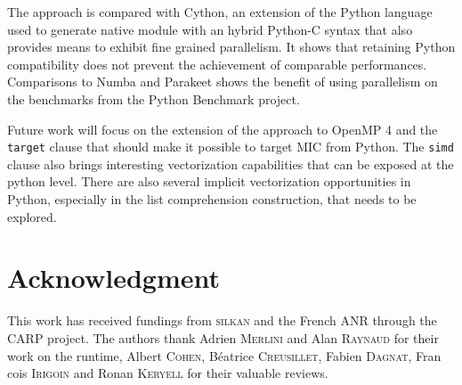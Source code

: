 \documentclass[conference]{IEEEtran}
\begin{document}
The approach is compared with Cython, an extension of the Python language used
to generate native module with an hybrid Python-C syntax that also provides
means to exhibit fine grained parallelism. It shows that retaining Python
compatibility does not prevent the achievement of comparable performances.
Comparisons to Numba and Parakeet shows the benefit of using parallelism on the
benchmarks from the Python Benchmark project.

Future work will focus on the extension of the approach to OpenMP 4 and the
\texttt{target} clause that should make it possible to target MIC from Python.
The \texttt{simd} clause also brings interesting vectorization capabilities that
can be exposed at the python level.  There are also several implicit vectorization
opportunities in Python, especially in the list comprehension construction, that
needs to be explored.

\section*{Acknowledgment}

This work has received fundings from \textsc{silkan} and the French ANR through
the CARP project. The authors thank Adrien \textsc{Merlini} and Alan
\textsc{Raynaud} for their work on the runtime, Albert \textsc{Cohen},
B{\'e}atrice \textsc{Creusillet}, Fabien \textsc{Dagnat}, Fran{\,c}ois
\textsc{Irigoin} and Ronan \textsc{Keryell} for their valuable reviews.



\end{document}
